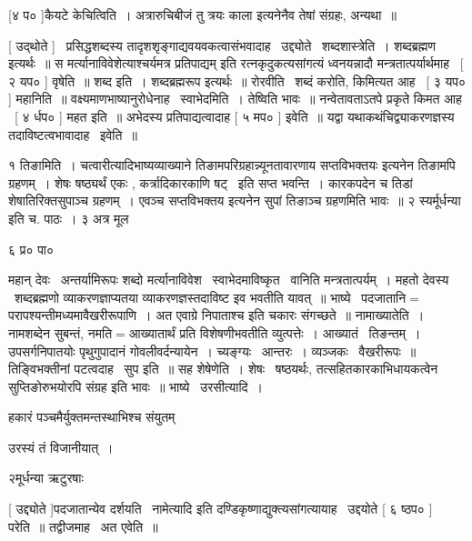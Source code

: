 \documentclass[11pt, openany]{book}
\begin{document}
 [४ प० ]कैयटे केचित्विति~। अत्रारुचिबीजं तु त्रयः काला इत्यनेनैव
तेषां संग्रहः, अन्यथा~॥ 

 [ उद्थोते ] \textendash\ प्रसिद्धशब्दस्य
तादृशशृङ्गाद्यवयवकत्वासंभवादाह \textendash\ उद्द्योते \textendash\ शब्दशास्त्रेति~। शब्दब्रह्मण
इत्यर्थः~॥ {\qt स मर्त्यानाविवेशेत्याश्चर्यमत्र प्रतिपाद्यम्} इति
रत्नकृदुकत्यसांगत्यं ध्वनयन्नादौ मन्त्रतात्पर्यार्थमाह \textendash\ [ २ यप० ]
वृषेति~॥ शब्द इति~। शब्दब्रह्मरूप इत्यर्थः~॥ रोरवीति \textendash\ शब्दं करोति,
किमित्यत आह \textendash\ [ ३ यप० ] महानिति~॥
वक्ष्यमाणभाष्यानुरोधेनाह \textendash\ स्वाभेदमिति~। तेष्विति भावः~॥ नन्वेतावताऽतपे
प्रकृते किमत आह \textendash\ [ ४ र्धप० ] महत इति~॥ अभेदस्य प्रतिपाद्यत्वादाह
[ ५ मप० ] इवेति~॥ यद्वा यथाकथंचिद्व्याकरणज्ञस्य
तदाविष्टत्वभावादाह \textendash\ इवेति~॥ 



 १ तिङामिति~। चत्वारीत्यादिभाष्यव्याख्याने तिङामपरिग्रहान्न्यूनतावारणाय
{\qt सप्तविभक्तयः} इत्यनेन तिङामपि ग्रहणम्~। शेषः षष्ठ्यर्थं एकः ,
कर्त्रादिकारकाणि षट् \textendash\ इति सप्त भवन्ति~। कारकपदेन च तिडां
शेषातिरिक्तसुपाञ्च ग्रहणम्~। एवञ्च सप्तविभक्तय इत्यनेन सुपां तिङाञ्च
ग्रहणमिति भावः~॥ २ {\qt स्यर्मूर्धन्या} इति च. पाठः~। ३ अत्र मूल \textendash\ 

६ प्र० पा०





महान् देवः \textendash\ अन्तर्यामिरूपः शब्दो मर्त्यानाविवेश \textendash\ स्वाभेदमाविष्कृत \textendash\ वानिति
मन्त्रतात्पर्यम्~। महतो देवस्य \textendash\ शब्दब्रह्मणो व्याकरणज्ञाप्यतया
व्याकरणज्ञस्तदाविष्ट इव भवतीति यावत्~॥
भाष्ये \textendash\ पदजातानि$=$परापश्यन्तीमध्यमावैखरीरूपाणि~। अत एवाग्रे निपाताश्च इति
चकारः संगच्छते~॥ नामाख्यातेति~। नामशब्देन सुबन्तं, नमति$=$आख्यातार्थं
प्रति विशेषणीभवतीति व्युत्पत्तेः~। आख्यातं \textendash\ तिङन्तम्~। उपसर्गनिपातयोः
पृथुगुपादानं गोवलीवर्दन्यायेन~। च्यङ्ग्यः \textendash\ आन्तरः~। व्यञ्जकः \textendash\ वैखरीरूपः~॥
तिङ्विभक्तीनां पटत्वदाह \textendash\ सुप इति~॥ सह शेषेणेति~। शेषः \textendash\ षष्ठयर्थः,
तत्सहितकारकाभिधायकत्वेन सुप्तिङोरुभयोरपि संग्रह इति भावः~॥
भाष्ये \textendash\ उरसीत्यादि~। 

 {\qt हकारं पञ्चमैर्युक्तमन्तस्थाभिश्च संयुतम् 

 उरस्यं तं विजानीयात्~।}

 {\qt २मूर्धन्या ऋटुरषाः}



 [ उद्द्योते ]{\qt पदजातान्येव दर्शयति \textendash\ नामेत्यादि} इति
दण्डिकृष्णाद्युक्त्यसांगत्यायाह \textendash\ उद्दयोते [ ६ ष्ठप० ] परेति~॥
तद्वीजमाह \textendash\ अत एवेति~॥ 
\end{document}
